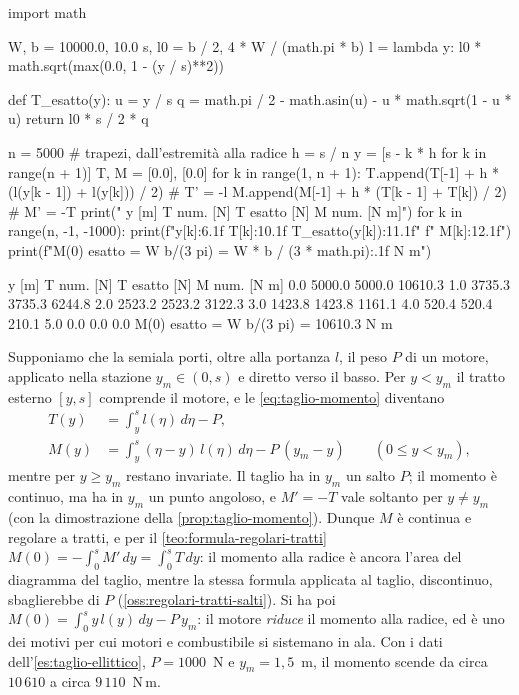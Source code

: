 \begin{python}
import math

W, b = 10000.0, 10.0
s, l0 = b / 2, 4 * W / (math.pi * b)
l = lambda y: l0 * math.sqrt(max(0.0, 1 - (y / s)**2))

def T_esatto(y):
    u = y / s
    q = math.pi / 2 - math.asin(u) - u * math.sqrt(1 - u * u)
    return l0 * s / 2 * q

n = 5000                     # trapezi, dall'estremità alla radice
h = s / n
y = [s - k * h for k in range(n + 1)]
T, M = [0.0], [0.0]
for k in range(1, n + 1):
    T.append(T[-1] + h * (l(y[k - 1]) + l(y[k])) / 2)    # T' = -l
    M.append(M[-1] + h * (T[k - 1] + T[k]) / 2)          # M' = -T
print("  y [m]   T num. [N]  T esatto [N]   M num. [N m]")
for k in range(n, -1, -1000):
    print(f"{y[k]:6.1f}  {T[k]:10.1f}  {T_esatto(y[k]):11.1f}"
          f"  {M[k]:12.1f}")
print(f"M(0) esatto = W b/(3 pi) = {W * b / (3 * math.pi):.1f} N m")
\end{python}
\begin{risultato}
  y [m]   T num. [N]  T esatto [N]   M num. [N m]
   0.0      5000.0       5000.0       10610.3
   1.0      3735.3       3735.3        6244.8
   2.0      2523.2       2523.2        3122.3
   3.0      1423.8       1423.8        1161.1
   4.0       520.4        520.4         210.1
   5.0         0.0          0.0           0.0
M(0) esatto = W b/(3 pi) = 10610.3 N m
\end{risultato}

\begin{osservazione}\label{oss:motore-ala}
Supponiamo che la semiala porti, oltre alla portanza $l$, il peso $P$ di un motore,
applicato nella stazione $y_{m}\in(0,s)$ e diretto verso il basso. Per $y<y_{m}$ il tratto
esterno $[y,s]$ comprende il motore, e le \eqref{eq:taglio-momento} diventano
\[
\begin{aligned}
  T(y)&=\int_{y}^{s}l(\eta)\,d\eta-P,\\
  M(y)&=\int_{y}^{s}(\eta-y)\,l(\eta)\,d\eta-P\,(y_{m}-y) \qquad (0\le y<y_{m}),
\end{aligned}
\]
mentre per $y\ge y_{m}$ restano invariate. Il taglio ha in $y_{m}$ un salto $P$; il
momento è continuo, ma ha in $y_{m}$ un punto angoloso, e $M'=-T$ vale soltanto per
$y\neq y_{m}$ (con la dimostrazione della \cref{prop:taglio-momento}). Dunque $M$ è
continua e regolare a tratti, e per il \cref{teo:formula-regolari-tratti}
$M(0)=-\int_{0}^{s}M'\,dy=\int_{0}^{s}T\,dy$: il momento alla radice è ancora l'area del
diagramma del taglio, mentre la stessa formula applicata al taglio, discontinuo,
sbaglierebbe di $P$ (\cref{oss:regolari-tratti-salti}). Si ha poi
$M(0)=\int_{0}^{s}y\,l(y)\,dy-P\,y_{m}$: il motore \emph{riduce} il momento alla radice, ed
è uno dei motivi per cui motori e combustibile si sistemano in ala. Con i dati
dell'\cref{es:taglio-ellittico}, $P=1000$~N e $y_{m}=1{,}5$~m, il momento scende da circa
$10\,610$ a circa $9\,110$~N\,m.
\end{osservazione}

